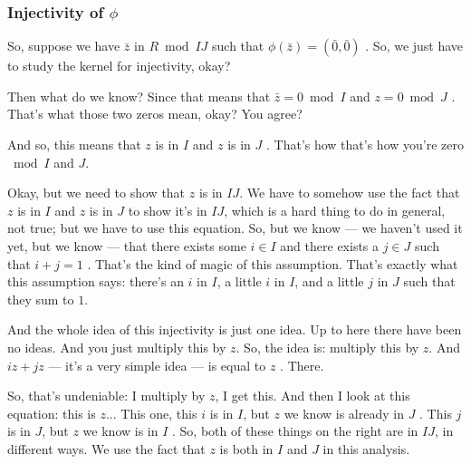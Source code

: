 \begin{proofWrapper}

\subsubsection{Injectivity of \texorpdfstring{$\phi$}{phi}}

\begin{speech}[00:06:11 - 00:07:50]
So, suppose we have $\bar{z}$ in $R \bmod IJ$  such that $\phi(\bar{z}) = (\bar{0}, \bar{0})$ . So, we just have to study the kernel for injectivity, okay?

Then what do we know? Since that means that $\bar{z} = 0 \bmod I$ and $z = 0 \bmod J$ . That's what those two zeros mean, okay? You agree?

And so, this means that $z$ is in $I$ and $z$ is in $J$ . That's how that's how you're zero $\bmod I$ and $J$.

Okay, but we need to show that $z$ is in $IJ$. We have to somehow use the fact that $z$ is in $I$ and $z$ is in $J$ to show it's in $IJ$, which is a hard thing to do in general, not true; but we have to use this equation. So, but we know --- we haven't used it yet, but we know --- that there exists some $i \in I$ and there exists a $j \in J$ such that $i + j = 1$ . That's the kind of magic of this assumption. That's exactly what this assumption says: there's an $i$ in $I$, a little $i$ in $I$, and a little $j$ in $J$ such that they sum to $1$.
\end{speech}

\begin{speech}[00:07:50 - 00:09:25]
And the whole idea of this injectivity is just one idea. Up to here there have been no ideas. And you just multiply this by $z$. So, the idea is: multiply this by $z$. And $iz + jz$ --- it's a very simple idea --- is equal to $z$ . There.

So, that's undeniable: I multiply by $z$, I get this. And then I look at this equation: this is $z$... This one, this $i$ is in $I$, but $z$ we know is already in $J$ . This $j$ is in $J$, but $z$ we know is in $I$ . So, both of these things on the right are in $IJ$, in different ways. We use the fact that $z$ is both in $I$ and $J$ in this analysis.


\end{speech}
\end{proofWrapper}

